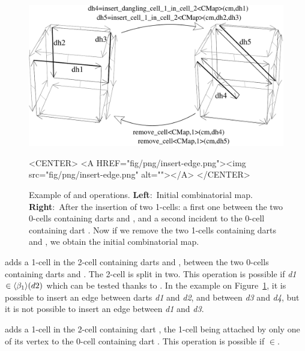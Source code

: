 \begin{figure}[htb]
  \begin{ccTexOnly}
    \begin{center}
      \includegraphics[width=.72\textwidth]{Combinatorial_map/fig/pdf/insert-edge}
    \end{center}
  \end{ccTexOnly}
  \begin{ccHtmlOnly}
    <CENTER> <A HREF="fig/png/insert-edge.png"><img
    src="fig/png/insert-edge.png" alt=""></A> </CENTER>
  \end{ccHtmlOnly}
  \caption{Example of  and
     operations. \textbf{Left}:~Initial
    combinatorial map.  \textbf{Right}:~After the insertion of two
    1-cells: a first one between the two 0-cells containing darts
     and , and a second incident to the 0-cell
    containing dart . Now if we remove the two
    1-cells containing darts  and , we obtain the
    initial combinatorial map.}
  \label{fig-insert-edge}
\end{figure}
{} adds a 1-cell in
the 2-cell containing darts  and , between the two
0-cells containing darts  and . The 2-cell is split
in two. This operation is possible if \emph{d1} $\in \langle{}\beta_1\rangle{}(d2)$
which can be tested thanks to
.  In the example on
Figure~\ref{fig-insert-edge}, it is possible to insert an edge
between darts \emph{d1} and \emph{d2}, and between \emph{d3} and \emph{d4}, but it is
not possible to insert an edge between \emph{d1} and \emph{d3}.

{} adds a 1-cell in
the 2-cell containing dart , the 1-cell being attached by only
one of its vertex to the 0-cell containing dart .
This operation is possible if $\in$.

